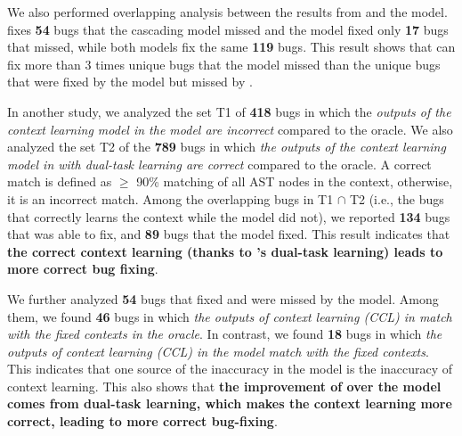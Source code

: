 We also performed overlapping analysis between the results from
{\tool} and the  model. {\tool} fixes {\bf 54} bugs
that the cascading model missed and the  model fixed
only {\bf 17} bugs that {\tool} missed, while both models fix the same
{\bf 119} bugs. This result shows that {\tool} can fix more than 3
times unique bugs that the  model missed than the
unique bugs that were fixed by the  model but missed
by {\tool}.




In another study, we analyzed the set T1 of {\bf 418} bugs in which
the {\em outputs of the context learning model in the 
  model are incorrect} compared to the oracle. We also analyzed the
set T2 of the {\bf 789} bugs in which {\em the outputs of the context
  learning model in {\tool} with dual-task learning are correct}
compared to the oracle. A correct match is defined as $\geq$ 90\%
matching of all AST nodes in the context, otherwise, it is an
incorrect match. Among the overlapping bugs in T1 $\cap$ T2 (i.e., the
bugs that {\tool} correctly learns the context while the
 model did not), we reported {\bf 134} bugs that
     {\tool} was able to fix, and {\bf 89} bugs that the
      model fixed.  This result indicates that {\bf
       the correct context learning (thanks to {\tool}'s dual-task
       learning) leads to more correct bug fixing}.

We further analyzed {\bf 54} bugs that {\tool} fixed and were missed
by the  model. Among them, we found {\bf 46} bugs in
which {\em the outputs of context learning (CCL) in {\tool} match with the fixed contexts
  in the oracle}. In contrast, we found {\bf 18} bugs in which {\em
  the outputs of context learning (CCL) in the  model match with the
  fixed contexts}. This indicates that one source of the inaccuracy in
the  model is the inaccuracy of context learning. This
also shows that {\bf the improvement of {\tool} over the
   model comes from dual-task learning, which makes
  the context learning more correct, leading to more correct
  bug-fixing}.



